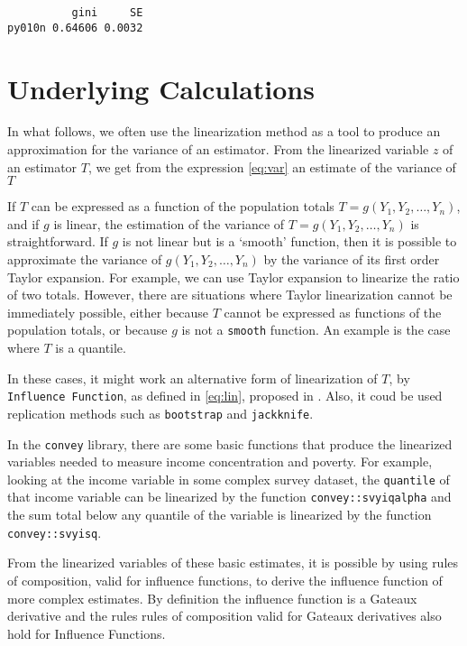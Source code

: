 \documentclass[]{book}
\begin{document}
\begin{verbatim}
          gini     SE
py010n 0.64606 0.0032
\end{verbatim}

\section{Underlying Calculations}\label{underlying-calculations}

In what follows, we often use the linearization method as a tool to
produce an approximation for the variance of an estimator. From the
linearized variable \(z\) of an estimator \(T\), we get from the
expression \eqref{eq:var} an estimate of the variance of \(T\)

If \(T\) can be expressed as a function of the population totals
\(T = g(Y_1, Y_2, \ldots, Y_n)\), and if \(g\) is linear, the estimation
of the variance of \(T = g(Y_1, Y_2, \ldots, Y_n)\) is straightforward.
If \(g\) is not linear but is a `smooth' function, then it is possible
to approximate the variance of \(g(Y_1, Y_2, \ldots, Y_n)\) by the
variance of its first order Taylor expansion. For example, we can use
Taylor expansion to linearize the ratio of two totals. However, there
are situations where Taylor linearization cannot be immediately
possible, either because \(T\) cannot be expressed as functions of the
population totals, or because \(g\) is not a \texttt{smooth} function.
An example is the case where \(T\) is a quantile.

In these cases, it might work an alternative form of linearization of
\(T\), by \texttt{Influence\ Function}, as defined in \eqref{eq:lin},
proposed in \citep{deville1999}. Also, it coud be used replication
methods such as \texttt{bootstrap} and \texttt{jackknife}.

In the \texttt{convey} library, there are some basic functions that
produce the linearized variables needed to measure income concentration
and poverty. For example, looking at the income variable in some complex
survey dataset, the \texttt{quantile} of that income variable can be
linearized by the function \texttt{convey::svyiqalpha} and the sum total
below any quantile of the variable is linearized by the function
\texttt{convey::svyisq}.

From the linearized variables of these basic estimates, it is possible
by using rules of composition, valid for influence functions, to derive
the influence function of more complex estimates. By definition the
influence function is a Gateaux derivative and the rules rules of
composition valid for Gateaux derivatives also hold for Influence
Functions.
\end{document}
